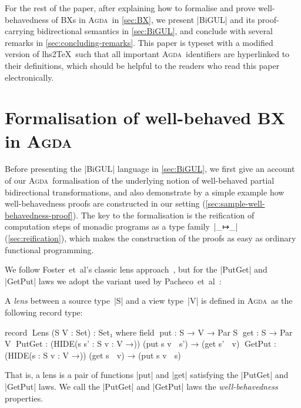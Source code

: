 \documentclass[fleqn]{llncs}
\renewcommand{\emph}{\textsl}
\newcommand{\Agda}{\textsc{Agda}}
\begin{document}
For the rest of the paper, after explaining how to formalise and prove well-behavedness of BXs in \Agda\ in \autoref{sec:BX}, we present |BiGUL| and its proof-carrying bidirectional semantics in \autoref{sec:BiGUL}, and conclude with several remarks in \autoref{sec:concluding-remarks}.
This paper is typeset with a modified version of lhs2\TeX\ such that all important \Agda\ identifiers are hyperlinked to their definitions, which should be helpful to the readers who read this paper electronically.


\section{Formalisation of well-behaved BX in \Agda}
\label{sec:BX}

Before presenting the |BiGUL| language in \autoref{sec:BiGUL}, we first give an account of our \Agda\ formalisation of the underlying notion of well-behaved partial bidirectional transformations, and also demonstrate by a simple example how well-behavedness proofs are constructed in our setting (\autoref{sec:sample-well-behavedness-proof}).
The key to the formalisation is the reification of computation steps of monadic programs as a type family~|_↦_| (\autoref{sec:reification}), which makes the construction of the proofs as easy as ordinary functional programming.

We follow Foster~et~al's classic lens approach~\cite{Foster-lenses}, but for the |PutGet| and |GetPut| laws we adopt the variant used by Pacheco~et~al~\cite{Pacheco-putlenses}:
\begin{definition*}[lenses]
A \emph{lens} between a source type~|S| and a view type~|V| is defined in \Agda\ as the following record type:
\begin{code}
record ^^^Lens (S V : Set) : Set₁ where
  field
    ^^^put  : S → V → Par S
    ^^^get  : S → Par V
    ^^^PutGet  : (HIDE({s s' : S} {v : V} →))  (put s v ↦ s') → (get s' ↦ v)
    ^^^GetPut  : (HIDE({s : S} {v : V} →))     (get s ↦ v) → (put s v ↦ s)
\end{code}
That is, a lens is a pair of functions |put| and |get| satisfying the |PutGet| and |GetPut| laws.
We call the |PutGet| and |GetPut| laws the \emph{well-behavedness} properties.
\end{definition*}
\end{document}
